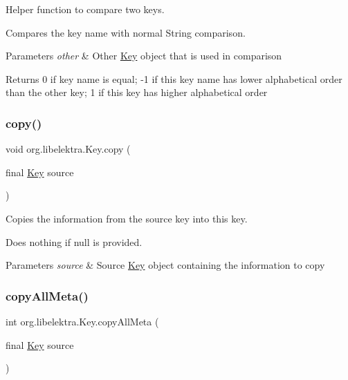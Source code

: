 Helper function to compare two keys. 

Compares the key name with normal String comparison.


\begin{DoxyParams}{Parameters}
{\em other} & Other \hyperlink{classorg_1_1libelektra_1_1Key}{Key} object that is used in comparison \\
\hline
\end{DoxyParams}
\begin{DoxyReturn}{Returns}
0 if key name is equal; -\/1 if this key name has lower alphabetical order than the other key; 1 if this key has higher alphabetical order 
\end{DoxyReturn}
\mbox{\label{classorg_1_1libelektra_1_1Key_abe0bb2790e29c52c12fec86a73818626}} 
\subsubsection{\texorpdfstring{copy()}{copy()}}
{\footnotesize\ttfamily void org.\+libelektra.\+Key.\+copy (\begin{DoxyParamCaption}\item[{final \hyperlink{classorg_1_1libelektra_1_1Key}{Key}}]{source }\end{DoxyParamCaption})\hspace{0.3cm}{\ttfamily [inline]}}



Copies the information from the source key into this key. 

Does nothing if null is provided.


\begin{DoxyParams}{Parameters}
{\em source} & Source \hyperlink{classorg_1_1libelektra_1_1Key}{Key} object containing the information to copy \\
\hline
\end{DoxyParams}
\mbox{\label{classorg_1_1libelektra_1_1Key_a9483ae832c9c16e4d68ed1c26babe2ce}} 
\subsubsection{\texorpdfstring{copy\+All\+Meta()}{copyAllMeta()}}
{\footnotesize\ttfamily int org.\+libelektra.\+Key.\+copy\+All\+Meta (\begin{DoxyParamCaption}\item[{final \hyperlink{classorg_1_1libelektra_1_1Key}{Key}}]{source }\end{DoxyParamCaption})\hspace{0.3cm}{\ttfamily [inline]}}



